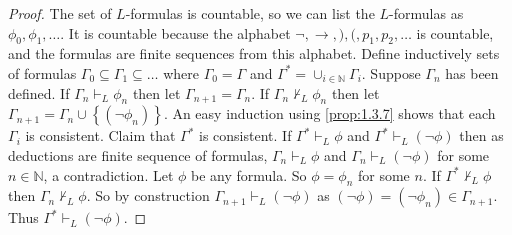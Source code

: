 \documentclass{article}
\newcommand{\N}{\mathbb{N}}
\newcommand{\rb}[1]{\left( #1 \right)}
\newcommand{\cb}[1]{\left\{ #1 \right\}}
\newcommand{\notb}[1]{\rb{\neg #1}}
\theoremstyle{definition}\newtheorem{definition}{Definition}[subsection]
\theoremstyle{definition}\newtheorem{remark}[definition]{Remark}
\theoremstyle{definition}\newtheorem*{example}{Example}
\theoremstyle{definition}\newtheorem*{note}{Note}
\begin{document}
\begin{proof}
The set of $ L $-formulas is countable, so we can list the $ L $-formulas as $ \phi_0, \phi_1, \dots $. It is countable because the alphabet $ \neg, \rightarrow, ), (, p_1, p_2, \dots $ is countable, and the formulas are finite sequences from this alphabet. Define inductively sets of formulas $ \Gamma_0 \subseteq \Gamma_1 \subseteq \dots $ where $ \Gamma_0 = \Gamma $ and $ \Gamma^* = \cup_{i \in \N} \Gamma_i $. Suppose $ \Gamma_n $ has been defined. If $ \Gamma_n \vdash_L \phi_n $ then let $ \Gamma_{n + 1} = \Gamma_n $. If $ \Gamma_n \not\vdash_L \phi_n $ then let $ \Gamma_{n + 1} = \Gamma_n \cup \cb{\notb{\phi_n}} $. An easy induction using \ref{prop:1.3.7} shows that each $ \Gamma_i $ is consistent. Claim that $ \Gamma^* $ is consistent. If $ \Gamma^* \vdash_L \phi $ and $ \Gamma^* \vdash_L \notb{\phi} $ then as deductions are finite sequence of formulas, $ \Gamma_n \vdash_L \phi $ and $ \Gamma_n \vdash_L \notb{\phi} $ for some $ n \in \N $, a contradiction. Let $ \phi $ be any formula. So $ \phi = \phi_n $ for some $ n $. If $ \Gamma^* \not\vdash_L \phi $ then $ \Gamma_n \not\vdash_L \phi $. So by construction $ \Gamma_{n + 1} \vdash_L \notb{\phi} $ as $ \notb{\phi} = \notb{\phi_n} \in \Gamma_{n + 1} $. Thus $ \Gamma^* \vdash_L \notb{\phi} $.
\end{proof}
\end{document}
